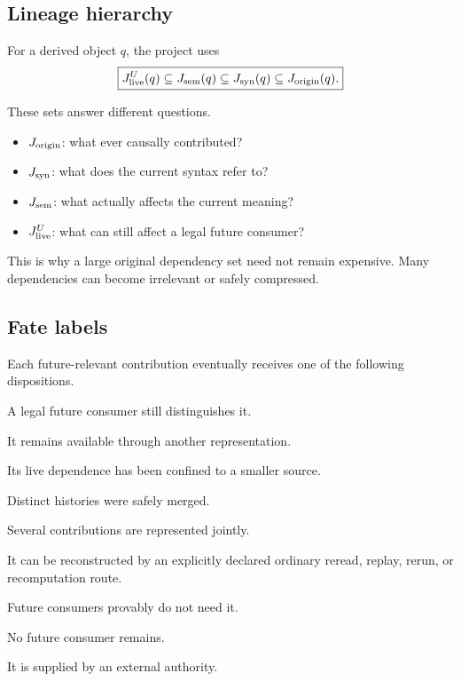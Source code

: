 \documentclass[11pt]{article}
\theoremstyle{plain}
\theoremstyle{definition}
\theoremstyle{remark}
\begin{document}
\subsection{Lineage hierarchy}

For a derived object \(q\), the project uses
\[
\boxed{
J_{\rm live}^{U}(q)
\subseteq
J_{\rm sem}(q)
\subseteq
J_{\rm syn}(q)
\subseteq
J_{\rm origin}(q).
}
\]

These sets answer different questions.

\begin{itemize}[leftmargin=1.4em]
\item \(J_{\rm origin}\): what ever causally contributed?
\item \(J_{\rm syn}\): what does the current syntax refer to?
\item \(J_{\rm sem}\): what actually affects the current meaning?
\item \(J_{\rm live}^{U}\): what can still affect a legal future consumer?
\end{itemize}

This is why a large original dependency set need not remain expensive.  Many
dependencies can become irrelevant or safely compressed.

\subsection{Fate labels}

Each future-relevant contribution eventually receives one of the following
dispositions.

\begin{description}[leftmargin=1.8em,style=nextline]
\item[LIVE] A legal future consumer still distinguishes it.
\item[ENCODED] It remains available through another representation.
\item[LOCALIZED] Its live dependence has been confined to a smaller source.
\item[QUOTIENTED] Distinct histories were safely merged.
\item[COMBINED] Several contributions are represented jointly.
\item[REACQUIRABLE] It can be reconstructed by an explicitly declared ordinary reread, replay, rerun, or recomputation route.
\item[IRRELEVANT] Future consumers provably do not need it.
\item[TERMINAL] No future consumer remains.
\item[EXTERNAL] It is supplied by an external authority.
\end{description}
\end{document}
